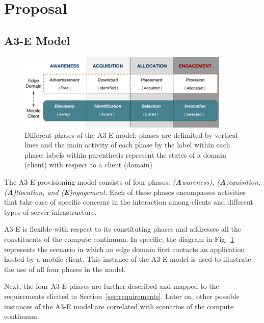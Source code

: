 \section{Proposal}\label{sec:proposal}



\subsection{A3-E Model}

\begin{figure}[tbp]
	\includegraphics[width=0.9\textwidth]{figs/A3-E.png}
	\caption{Different phases of the A3-E model; phases are delimited by vertical lines and the main activity of each phase by the label within each phase; labels within parenthesis represent the states of a domain (client) with respect to a client (domain)}
	\label{fig:A3-E-model}
\end{figure}

The A3-E provisioning model consists of four phases: \textit{(\textbf{A}wareness), (\textbf{A})cquisition, (\textbf{A})llocation, and (\textbf{E})ngagement}. Each of these phases encompasses activities that take care of specific concerns in the interaction among clients and different types of server infrastructure. 


A3-E is flexible with respect to its constituting phases and addresses all the constituents of the compute continuum. In specific, the diagram in Fig.~\ref{fig:A3-E-model} represents the scenario in which an edge domain first contacts an application hosted by a mobile client. This instance of the A3-E model is used to illustrate the use of all four phases in the model. 

Next, the four A3-E phases are further described and mapped to the requirements elicited in  Section~\ref{sec:requirements}. Later on, other possible instances of the A3-E model are correlated with scenarios of the compute continuum.

